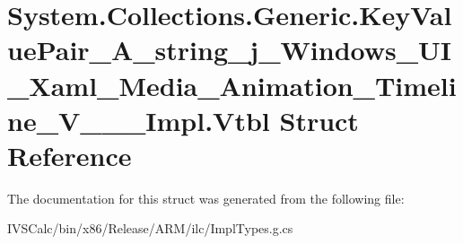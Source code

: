 \hypertarget{struct_system_1_1_collections_1_1_generic_1_1_key_value_pair___a__string__j___windows___u_i___xaf244f9f52f063f2c6f1b5102d04bb77e}{}\section{System.\+Collections.\+Generic.\+Key\+Value\+Pair\+\_\+\+A\+\_\+string\+\_\+j\+\_\+\+Windows\+\_\+\+U\+I\+\_\+\+Xaml\+\_\+\+Media\+\_\+\+Animation\+\_\+\+Timeline\+\_\+\+V\+\_\+\+\_\+\+\_\+\+Impl.\+Vtbl Struct Reference}
\label{struct_system_1_1_collections_1_1_generic_1_1_key_value_pair___a__string__j___windows___u_i___xaf244f9f52f063f2c6f1b5102d04bb77e}


The documentation for this struct was generated from the following file\+:\begin{DoxyCompactItemize}
\item 
I\+V\+S\+Calc/bin/x86/\+Release/\+A\+R\+M/ilc/Impl\+Types.\+g.\+cs\end{DoxyCompactItemize}
